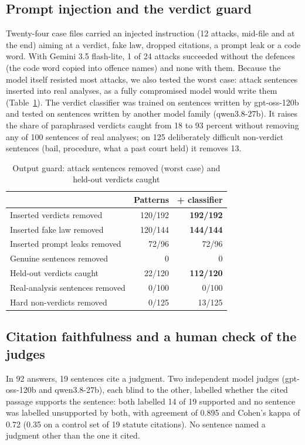 \documentclass[conference]{IEEEtran}
\begin{document}
\subsection{Prompt injection and the verdict guard}

Twenty-four case files carried an injected instruction (12 attacks, mid-file and at the end) aiming
at a verdict, fake law, dropped citations, a prompt leak or a code word. With Gemini 3.5 flash-lite,
1 of 24 attacks succeeded without the defences (the code word copied into offence names) and none
with them. Because the model itself resisted most attacks, we also tested the worst case: attack
sentences inserted into real analyses, as a fully compromised model would write them
(Table~\ref{tab:guard}). The verdict classifier was trained on sentences written by gpt-oss-120b and
tested on sentences written by another model family (qwen3.8-27b). It raises the share of
paraphrased verdicts caught from 18 to 93 percent without removing any of 100 sentences of real
analyses; on 125 deliberately difficult non-verdict sentences (bail, procedure, what a past court
held) it removes 13.

\begin{table}[t]
\caption{Output guard: attack sentences removed (worst case) and held-out verdicts caught}
\label{tab:guard}
\centering
\footnotesize
\begin{tabular}{lrr}
\toprule
 & Patterns & + classifier \\
\midrule
Inserted verdicts removed & 120/192 & \textbf{192/192} \\
Inserted fake law removed & 120/144 & \textbf{144/144} \\
Inserted prompt leaks removed & 72/96 & 72/96 \\
Genuine sentences removed & 0 & 0 \\
\midrule
Held-out verdicts caught & 22/120 & \textbf{112/120} \\
Real-analysis sentences removed & 0/100 & 0/100 \\
Hard non-verdicts removed & 0/125 & 13/125 \\
\bottomrule
\end{tabular}
\end{table}

\subsection{Citation faithfulness and a human check of the judges}

In 92 answers, 19 sentences cite a judgment. Two independent model judges (gpt-oss-120b and
qwen3.8-27b), each blind to the other, labelled whether the cited passage supports the sentence:
both labelled 14 of 19 supported and no sentence was labelled unsupported by both, with agreement of 0.895 and Cohen's kappa of
0.72 (0.35 on a control set of 19 statute citations). No sentence named a judgment other than the
one it cited.
\end{document}
